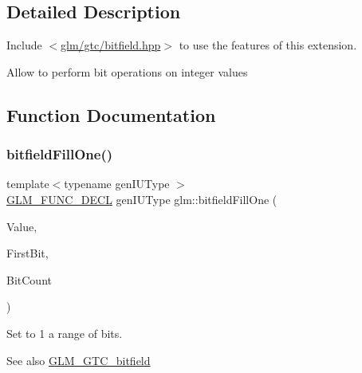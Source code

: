 \subsection{Detailed Description}
Include $<$\hyperlink{bitfield_8hpp}{glm/gtc/bitfield.\+hpp}$>$ to use the features of this extension.

Allow to perform bit operations on integer values 

\subsection{Function Documentation}
\mbox{\label{group__gtc__bitfield_ga46f9295abe3b5c7658f5b13c7f819f0a}} 
\subsubsection{\texorpdfstring{bitfield\+Fill\+One()}{bitfieldFillOne()}\hspace{0.1cm}{\footnotesize\ttfamily [1/2]}}
{\footnotesize\ttfamily template$<$typename gen\+I\+U\+Type $>$ \\
\hyperlink{setup_8hpp_ab2d052de21a70539923e9bcbf6e83a51}{G\+L\+M\+\_\+\+F\+U\+N\+C\+\_\+\+D\+E\+CL} gen\+I\+U\+Type glm\+::bitfield\+Fill\+One (\begin{DoxyParamCaption}\item[{gen\+I\+U\+Type}]{Value,  }\item[{int}]{First\+Bit,  }\item[{int}]{Bit\+Count }\end{DoxyParamCaption})}

Set to 1 a range of bits.

\begin{DoxySeeAlso}{See also}
\hyperlink{group__gtc__bitfield}{G\+L\+M\+\_\+\+G\+T\+C\+\_\+bitfield} 
\end{DoxySeeAlso}
\mbox{\label{group__gtc__bitfield_ga3e96dd1f0a4bc892f063251ed118c0c1}} 
